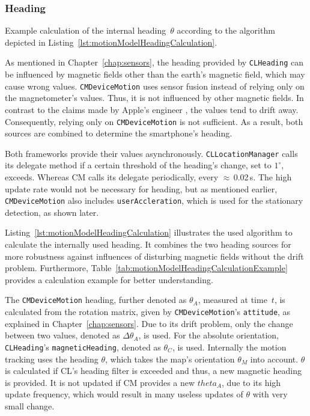 \subsubsection*{Heading}


\begin{table}
	
	\caption{Example calculation of the internal heading~$\theta$ according to the algorithm depicted in Listing~\ref{lst:motionModelHeadingCalculation}.}
	\label{tab:motionModelHeadingCalculationExample}
\end{table}

As mentioned in Chapter~\ref{chap:sensors}, the heading provided by \texttt{CLHeading} can be influenced by magnetic fields other than the earth's magnetic field, which may cause wrong values. \texttt{CMDevice\-Motion} uses sensor fusion instead of relying only on the magnetometer's values. Thus, it is not influenced by other magnetic fields. In contrast to the claims made by Apple's engineer \citet{apple:wwdc_2012_pham}, the values tend to drift away. Consequently, relying only on \texttt{CMDeviceMotion} is not sufficient. As a result, both sources are combined to determine the smartphone's heading.

Both frameworks provide their values asynchronously. \texttt{CLLocationManager} calls its delegate method if a certain threshold of the heading's change, set to $1^\circ$, exceeds. Whereas \acs{CM} calls its delegate periodically, every $\approx$\,0.02\,s. The high update rate would not be necessary for heading, but as mentioned earlier, \texttt{CMDeviceMotion} also includes \texttt{userAccleration}, which is used for the stationary detection, as shown later.

Listing~\ref{lst:motionModelHeadingCalculation} illustrates the used algorithm to calculate the internally used heading. It combines the two heading sources for more robustness against influences of disturbing magnetic fields without the drift problem. Furthermore, Table~\ref{tab:motionModelHeadingCalculationExample} provides a calculation example for better understanding.

The \texttt{CMDeviceMotion} heading, further denoted as $\theta_A$, measured at time~$t$, is calculated from the rotation matrix, given by \texttt{CMDeviceMotion}'s \texttt{attitude}, as explained in Chapter~\ref{chap:sensors}. Due to its drift problem, only the change between two values, denoted as $\Delta\theta_A$, is used. For the absolute orientation, \texttt{CLHeading}'s \texttt{magneticHeading}, denoted as $\theta_C$, is used. Internally the motion tracking uses the heading $\theta$, which takes the map's orientation $\theta_M$ into account. $\theta$ is calculated if \acs{CL}'s heading filter is exceeded and thus, a new magnetic heading is provided. It is not updated if \acs{CM} provides a new $theta_A$, due to its high update frequency, which would result in many useless updates of $\theta$ with very small change.


